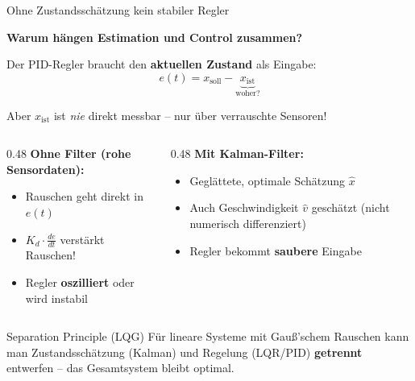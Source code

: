 \documentclass[%
  aspectratio=169,
  10pt
]{beamer}
\newcommand{\hl}[1]{{\color{fbblau}\textbf{#1}}}
\newcommand{\warn}[1]{{\color{blackberry}\textbf{#1}}}
\begin{document}
\begin{frame}{Ohne Zustandsschätzung kein stabiler Regler}

\textbf{Warum hängen Estimation und Control zusammen?}

\vspace{2mm}
Der PID-Regler braucht den \hl{aktuellen Zustand} als Eingabe:
\[
  e(t) = x_\mathrm{soll} - \underbrace{x_\mathrm{ist}}_{\text{woher?}}
\]

Aber $x_\mathrm{ist}$ ist \emph{nie} direkt messbar -- nur über verrauschte Sensoren!

\pause
\vspace{2mm}
\begin{columns}[T]
  \begin{column}{0.48\textwidth}
    \textbf{Ohne Filter (rohe Sensordaten):}
    \begin{itemize}
      \item Rauschen geht direkt in $e(t)$
      \item $K_d \cdot \frac{de}{dt}$ verstärkt Rauschen!
      \item Regler \warn{oszilliert} oder wird instabil
    \end{itemize}
  \end{column}
  \begin{column}{0.48\textwidth}
    \textbf{Mit Kalman-Filter:}
    \begin{itemize}
      \item Geglättete, optimale Schätzung $\hat{x}$
      \item Auch Geschwindigkeit $\hat{v}$ geschätzt (nicht numerisch differenziert)
      \item Regler bekommt \hl{saubere} Eingabe
    \end{itemize}
  \end{column}
\end{columns}

\vspace{3mm}
\begin{block}{Separation Principle (LQG)}
  Für lineare Systeme mit Gauß'schem Rauschen kann man
  Zustandsschätzung (Kalman) und Regelung (LQR/PID)
  \textbf{getrennt} entwerfen -- das Gesamtsystem bleibt optimal.
\end{block}

\end{frame}
\end{document}
